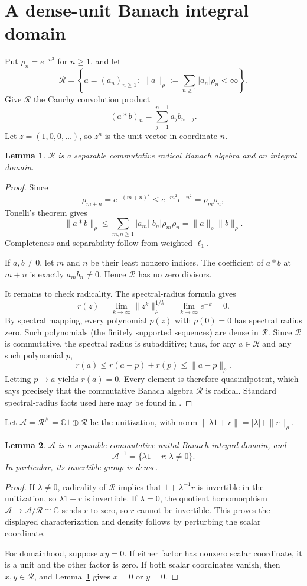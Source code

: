 \documentclass[11pt]{article}
\newtheorem{lemma}{Lemma}
\newcommand{\C}{\mathbb C}
\newcommand{\R}{\mathcal R}
\newcommand{\A}{\mathcal A}
\begin{document}
\section{A dense-unit Banach integral domain}

Put $\rho_n=e^{-n^2}$ for $n\ge1$, and let
\[
 \R=\left\{a=(a_n)_{n\ge1}:\
       \|a\|_\rho:=\sum_{n\ge1}|a_n|\rho_n<\infty\right\}.
\]
Give $\R$ the Cauchy convolution product
\[
 (a*b)_n=\sum_{j=1}^{n-1}a_jb_{n-j}.
\]
Let $z=(1,0,0,\ldots)$, so $z^n$ is the unit vector in coordinate $n$.

\begin{lemma}\label{lem:R}
$\R$ is a separable commutative radical Banach algebra and an integral
domain.
\end{lemma}

\begin{proof}
Since
\[
 \rho_{m+n}=e^{-(m+n)^2}\le e^{-m^2}e^{-n^2}=\rho_m\rho_n,
\]
Tonelli's theorem gives
\[
 \|a*b\|_\rho
 \le \sum_{m,n\ge1}|a_m||b_n|\rho_m\rho_n
 =\|a\|_\rho\|b\|_\rho.
\]
Completeness and separability follow from weighted $\ell_1$.

If $a,b\ne0$, let $m$ and $n$ be their least nonzero indices. The
coefficient of $a*b$ at $m+n$ is exactly $a_mb_n\ne0$. Hence $\R$ has no
zero divisors.

It remains to check radicality. The spectral-radius formula gives
\[
 r(z)=\lim_{k\to\infty}\|z^k\|_\rho^{1/k}
     =\lim_{k\to\infty}e^{-k}=0.
\]
By spectral mapping, every polynomial $p(z)$ with $p(0)=0$ has spectral
radius zero. Such polynomials (the finitely supported sequences) are dense
in $\R$. Since $\R$ is commutative, the spectral radius is subadditive; thus,
for any $a\in\R$ and any such polynomial $p$,
\[
        r(a)\le r(a-p)+r(p)\le\|a-p\|_\rho.
\]
Letting $p\to a$ yields $r(a)=0$. Every element is therefore
quasinilpotent, which says precisely that the commutative Banach algebra
$\R$ is radical. Standard spectral-radius facts used here may be found in
\cite{Dales2000}.
\end{proof}

Let $\A=\R^{\#}=\C1\oplus\R$ be the unitization, with norm
$\|\lambda1+r\|=|\lambda|+\|r\|_\rho$.

\begin{lemma}\label{lem:A}
$\A$ is a separable commutative unital Banach integral domain, and
\[
     \A^{-1}=\{\lambda1+r:\lambda\ne0\}.
\]
In particular, its invertible group is dense.
\end{lemma}

\begin{proof}
If $\lambda\ne0$, radicality of $\R$ implies that
$1+\lambda^{-1}r$ is invertible in the unitization, so $\lambda1+r$ is
invertible. If $\lambda=0$, the quotient homomorphism
$\A\to\A/\R\cong\C$ sends $r$ to zero, so $r$ cannot be invertible. This
proves the displayed characterization and density follows by perturbing the
scalar coordinate.

For domainhood, suppose $xy=0$. If either factor has nonzero scalar
coordinate, it is a unit and the other factor is zero. If both scalar
coordinates vanish, then $x,y\in\R$, and Lemma~\ref{lem:R} gives $x=0$ or
$y=0$.
\end{proof}
\end{document}

